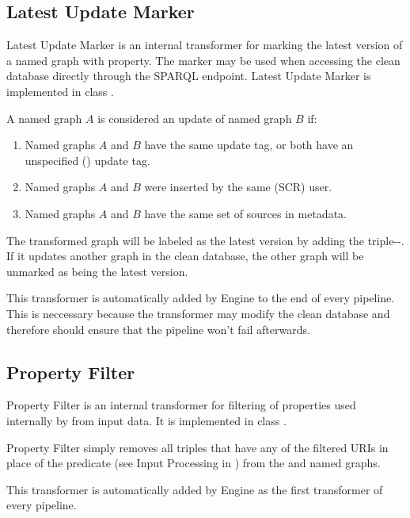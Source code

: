 \subsection{Latest Update Marker}
\label{sec:latestUpdateMarker}
Latest Update Marker is an internal transformer for marking the latest version of a named graph with  property. The marker may be used when accessing the clean database directly through the SPARQL endpoint. Latest Update Marker is implemented in class .

A named graph $A$ is considered an update of named graph $B$ if:
\begin{enumerate}
		\item Named graphs $A$ and $B$ have the same update tag, or both have an unspecified () update tag.
	  \item Named graphs $A$ and $B$ were inserted by the same (SCR) user.
	  \item Named graphs $A$ and $B$ have the same set of sources in metadata.
\end{enumerate}

The transformed graph will be labeled as the latest version by adding  the triple\linebreak {}--. If it updates another graph in the clean database, the other graph will be unmarked as being the latest version.

This transformer is automatically added by Engine to the end of every pipeline. This is neccessary because the transformer may modify the clean database and therefore should ensure that the pipeline won't fail afterwards.

\subsection{Property Filter}
Property Filter is an internal transformer for filtering of properties used internally by \odcs from input data. It is implemented in class .

Property Filter simply removes all triples that have any of the filtered URIs in place of the predicate (see Input Processing in ) from the  and  named graphs.

This transformer is automatically added by Engine as the first transformer of every pipeline.

